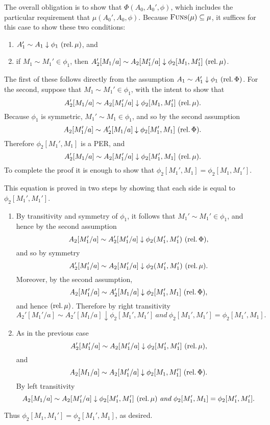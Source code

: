 \documentclass[11pt,twoside]{article}
\begin{document}
The overall obligation is to show that $\Phi(A_{0},A_{0}',\phi)$, which includes the particular
requirement that $\mu(A_{0}',A_{0},\phi)$.  Because $\textsc{Funs}(\mu)\subseteq\mu$, it suffices for this
case to show these two conditions:
\begin{enumerate}
\item $A_{1}'\sim A_{1}\downarrow\phi_{1}\ \relto{\mu}$, and
\item if $M_1\sim M_1'\in\phi_{1}$, then $A_{2}'[M_1/a]\sim A_{2}[M_1'/a]\downarrow\phi_{2}[M_1,M_1']\ (\text{rel.}\,\mu)$.
\end{enumerate}
The first of these follows directly from the assumption
$A_{1}\sim A_{1}'\downarrow\phi_{1}\ \relto{\Phi}$.  For the second, suppose that
$M_1\sim M_1'\in\phi_{1}$, with the intent to show that
$$A_{2}'[M_1/a]\sim A_{2}[M_1'/a]\downarrow \phi_{2}[M_1,M_1']\ (\text{rel.}\,\mu).$$  Because $\phi_{1}$ is symmetric,
$M_1'\sim M_1\in\phi_{1}$, and so by the second assumption
$$A_{2}[M_1'/a] \sim A_{2}'[M_1/a]\downarrow\phi_{2}[M_1',M_1]\ (\text{rel.}\,\Phi).$$  Therefore $\phi_{2}[M_1',M_1]$ is a
PER, and
$$A_{2}'[M_1/a]\sim A_{2}[M_1'/a]\downarrow\phi_{2}[M_1',M_1]\ (\text{rel.}\,\mu).$$  To complete the proof it is
enough to show that $\phi_{2}[M_1',M_1]=\phi_{2}[M_1,M_1']$.

This equation is proved in two steps by showing that each side is equal to
$\phi_{2}[M_{1}',M_{1}']$.
\begin{enumerate}
\item By transitivity and symmetry of $\phi_{1}$, it follows that $M_{1}'\sim M_{1}'\in\phi_{1}$, and
  hence by the second assumption $$A_{2}[M_{1}'/a]\sim
  A_{2}'[M_{1}'/a]\downarrow\phi_{2}(M_{1}',M_{1}')\ \relto{\Phi},$$ and so by symmetry
  $$A_{2}'[M_{1}'/a]\sim A_{2}[M_{1}'/a]\downarrow\phi_{2}(M_{1}',M_{1}')\ (\text{rel.}\,\mu).$$
  Moreover, by the second assumption, $$A_{2}[M_{1}'/a] \sim
  A_{2}'[M_{1}/a]\downarrow\phi_{2}[M_{1}',M_{1}]\ \relto{\Phi},$$ and hence $(\text{rel.}\,\mu)$.
  Therefore by right transitivity
  $$A_{2}'[M_{1}'/a]\sim A_{2}'[M_{1}/a]\downarrow\phi_{2}[M_{1}',M_{1}']\ \textit{and}\ \phi_{2}[M_{1}',M_{1}']=\phi_{2}[M_{1}',M_{1}].$$
\item
  As in the previous case $$A_{2}'[M_{1}'/a] \sim A_{2}[M_{1}'/a] \downarrow \phi_{2}[M_{1}',M_{1}']\ (\text{rel.}\,\mu),$$
  and $$A_{2}[M_{1}/a]\sim A_{2}[M_{1}'/a]\downarrow\phi_{2}[M_{1},M_{1}']\ (\text{rel.}\,\Phi).$$
  By left transitivity
  $$A_{2}[M_{1}/a] \sim A_{2}[M_{1}'/a] \downarrow \phi_{2}[M_{1}',M_{1}']\ \relto{\mu}\ \textit{and}\
  \phi_2[M_1',M_1]=\phi_2[M_1',M_1'].$$
\end{enumerate}
Thus $\phi_{2}[M_{1},M_{1}']=\phi_{2}[M_{1}',M_{1}]$, as desired.
\end{document}
